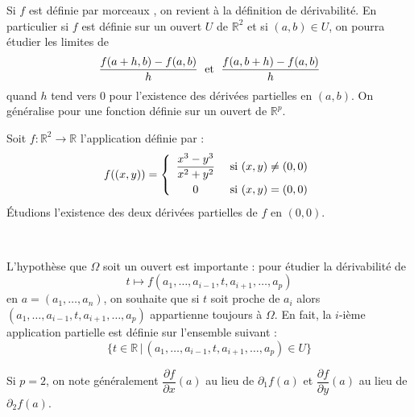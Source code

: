 \documentclass[a4paper,10pt]{report}
\begin{document}
\medskip

\begin{rem} Si $f$ est définie \og par morceaux \fg, on revient à la définition de dérivabilité. En particulier si $f$ est définie sur un ouvert $U$ de $\mathbb{R}^2$ et si $(a,b) \in U$, on pourra étudier les limites de 
$$ \dfrac{f(a+h,b)-f(a,b)}{h} \; \hbox{ et } \; \dfrac{f(a,b+h)-f(a,b)}{h}$$
quand $h$ tend vers $0$ pour l'existence des dérivées partielles en $(a,b)$. On généralise pour une fonction définie sur un ouvert de $\mathbb{R}^p$.
\end{rem}

\medskip

\begin{ex} Soit $f : \mathbb{R}^2 \rightarrow \mathbb{R}$ l'application définie par :
$$ f((x,y)) = \left\lbrace \begin{array}{ccl}
\dfrac{x^3-y^3}{x^2+y^2} & \hbox{ si } (x,y) \neq (0,0) \\[0.3cm]
0 & \hbox{ si } (x,y)=(0,0) \\
\end{array}\right.$$
Étudions l'existence des deux dérivées partielles de $f$ en $(0,0)$.

%

\vspace{8cm}
\end{ex}

\newpage

$\phantom{test}$

\vspace{4cm}

\begin{rems}
\item L'hypothèse que $\Omega$ soit un ouvert est importante : pour étudier la dérivabilité de 
$$  t \mapsto f(a_1, \ldots, a_{i-1}, t, a_{i+1}, \ldots, a_p) $$
en $a=(a_1, \ldots, a_n)$, on souhaite que si $t$ soit proche de $a_i$ alors $(a_1, \ldots, a_{i-1}, t, a_{i+1}, \ldots, a_p)$ appartienne toujours à $\Omega$. En fait, la $i$-ième application partielle est définie sur l'ensemble suivant :
$$ \lbrace t \in \mathbb{R} \, \vert \, (a_1, \ldots, a_{i-1}, t, a_{i+1}, \ldots, a_p) \in U \rbrace$$
\item Si $p=2$, on note généralement $\dfrac{\partial f}{\partial x}(a)$ au lieu de $\partial_1 f(a)$ et $\dfrac{\partial f}{\partial y}(a)$ au lieu de $\partial_2 f(a)$.
\end{rems}
\end{document}
